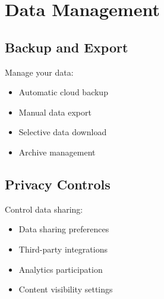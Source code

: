 \section{Data Management}

\subsection{Backup and Export}

Manage your data:

\begin{itemize}
    \item Automatic cloud backup
    \item Manual data export
    \item Selective data download
    \item Archive management
\end{itemize}

\subsection{Privacy Controls}

Control data sharing:

\begin{itemize}
    \item Data sharing preferences
    \item Third-party integrations
    \item Analytics participation
    \item Content visibility settings
\end{itemize}
